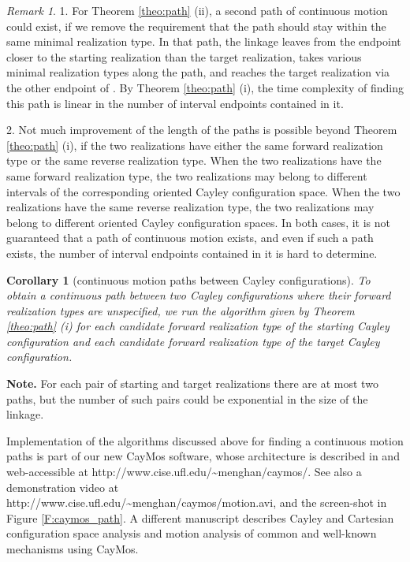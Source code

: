 \documentclass[secthm,amsthm,english]{article}
\newtheorem{corollary}{Corollary}
\theoremstyle{definition}
\theoremstyle{remark}
\newtheorem{remark}{Remark}
\begin{document}
\begin{remark}
1. For Theorem \ref{theo:path} (ii), 
a second path of continuous motion could exist, 
if we remove the requirement that the path should stay within the same minimal realization type.  
In that path, the linkage leaves  from the endpoint 
closer to the starting realization than the target realization, 
takes various minimal realization types along the path, 
and reaches the target realization via the other endpoint of . 
By Theorem \ref{theo:path} (i), the time complexity of finding this path is  linear in the number of interval endpoints contained in it.

2. Not much improvement of the length of the paths is possible beyond  Theorem \ref{theo:path} (i), 
if the two realizations have either the same forward realization type or the same reverse realization type.  
When the two realizations have the same forward realization type, 
the  two realizations may belong to different intervals of the corresponding oriented Cayley configuration space. 
When the two realizations have the same reverse realization type, the two realizations may belong to different oriented Cayley configuration spaces. 
In both cases, it is not guaranteed that a path of continuous motion exists, 
and even if such a path exists, the number of interval endpoints contained in it is hard to determine. 
\end{remark}

\begin{corollary}[continuous motion paths between Cayley configurations]
\label{corollary:path_between_cayley}
To obtain a continuous path between two Cayley configurations where their forward realization types are unspecified, 
we run the algorithm given by Theorem \ref{theo:path} (i) for each candidate forward realization type of the starting Cayley configuration and each candidate forward realization type of the target Cayley configuration.
\end{corollary}

\noindent\textbf{Note.} For each pair of starting and target realizations there are at most two paths, but the number of such pairs could be exponential in the size of the linkage. 



\bigskip
\noindent 
Implementation of the algorithms  discussed above 
for finding a continuous motion paths is part of our new CayMos software,
whose architecture is described in \cite{bib:caymos} and 
web-accessible at http://www.cise.ufl.edu/\~{}menghan/caymos/. 
See also a demonstration video 
at \\http://www.cise.ufl.edu/\~{}menghan/caymos/motion.avi, and the screen-shot in Figure \ref{F:caymos_path}. 
A different manuscript \cite{bib:beest} describes Cayley and Cartesian configuration space analysis and motion analysis 
of common and well-known mechanisms using CayMos.
\end{document}
